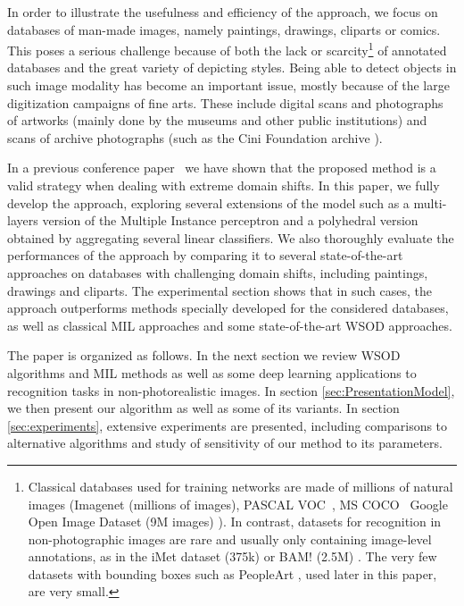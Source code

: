 \documentclass[preprint]{elsarticle}
\begin{document}
In order to illustrate the usefulness and efficiency of the approach, we focus on databases of man-made images, namely paintings, drawings, cliparts or comics. This poses a serious challenge because of both the lack or scarcity\footnote{Classical databases used for training networks are made of millions of natural images (Imagenet \citep{russakovsky_imagenet_2014}(millions of images), PASCAL VOC~\citep{everingham_pascal_2007}, MS COCO~\citep{lin_microsoft_2014} Google Open Image Dataset (9M images) \citep{kuznetsova_open_2020}). In contrast, datasets for recognition in non-photographic images are rare and usually only containing image-level annotations, as in the iMet dataset (375k) \citep{zhang_imet_2019} or BAM! (2.5M) \citep{wilber_bam_2017}. The very few datasets with bounding boxes such as PeopleArt \citep{westlake_detecting_2016}, used later in this paper, are very small.}  of annotated databases and the great variety of depicting styles. Being able to detect objects in such image modality has become an important issue, mostly because of the large digitization campaigns of fine arts. These include digital scans and photographs of artworks (mainly done by the museums and other public institutions) and scans of archive photographs (such as the Cini Foundation archive \citep{seguin_new_2018}).

In a previous conference paper~\citep{gonthier_weakly_2018} we have shown that the proposed method is a valid strategy when dealing with extreme domain shifts. In this paper, we fully develop the approach, exploring several extensions of the model such as a multi-layers version of the Multiple Instance perceptron and a polyhedral version obtained by aggregating several linear classifiers.
We also thoroughly evaluate the performances of the approach by comparing it to several state-of-the-art approaches on databases with challenging domain shifts, including paintings, drawings and cliparts. The experimental section shows that in such cases, the approach outperforms methods specially developed for the considered databases, as well as classical MIL approaches and some state-of-the-art WSOD approaches.  



 The paper is organized as follows. In the next section we review WSOD algorithms and MIL methods as well as some deep learning applications to recognition tasks in non-photorealistic images. In section \ref{sec:PresentationModel}, we then present our algorithm as well as some of its variants. In section \ref{sec:experiments}, extensive experiments are presented, including comparisons to alternative algorithms and study of sensitivity of our method to its parameters. 
\end{document}
